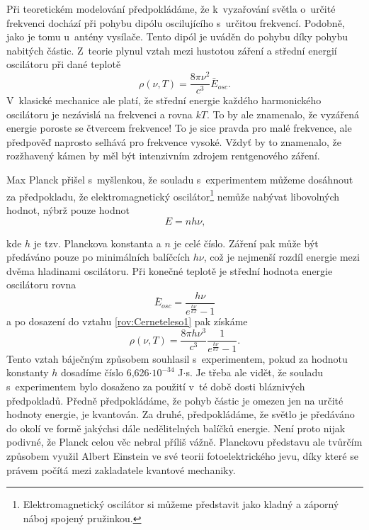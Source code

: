 Při teoretickém modelování předpokládáme, že k~vyzařování světla o~určité frekvenci dochází při pohybu dipólu oscilujícího s~určitou frekvencí. Podobně, jako je tomu u~antény vysílače. Tento dipól je uváděn do pohybu díky pohybu nabitých částic. Z~teorie plynul vztah mezi hustotou záření a střední energií oscilátoru při dané teplotě
\begin{equation}
\rho(\nu,T)=\frac{8\pi\nu^2}{c^3}\bar{E}_{osc}\mbox{.}
\label{rov:Cerneteleso1}
\end{equation}
V~klasické mechanice ale platí, že střední energie každého harmonického oscilátoru je nezávislá na frekvenci a rovna $kT$. To by ale znamenalo, že vyzářená energie poroste se čtvercem frekvence! To je sice pravda pro malé frekvence, ale předpověď naprosto selhává pro frekvence vysoké. Vždyť by to znamenalo, že rozžhavený kámen by měl být intenzivním zdrojem rentgenového záření. 

Max Planck přišel s~myšlenkou, že souladu s~experimentem můžeme dosáhnout za předpokladu, že elektromagnetický oscilátor\footnote{ Elektromagnetický oscilátor si můžeme představit jako kladný a záporný náboj spojený pružinkou.} nemůže nabývat libovolných hodnot, nýbrž pouze hodnot
\begin{equation}
E=nh\nu\mbox{,}
\label{rov:Cerneteleso2}
\end{equation}

\noindent kde $h$ je tzv. Planckova konstanta a $n$ je celé číslo. Záření pak může být předáváno pouze po minimálních balíčcích $h\nu$, což je nejmenší rozdíl energie mezi dvěma hladinami oscilátoru. Při konečné teplotě je střední hodnota energie oscilátoru rovna
\begin{equation}
\bar{E}_{osc}=\frac{h\nu}{e^{\frac{h\nu}{kT}}-1}\mbox{}
\label{rov:Cerneteleso3}
\end{equation}
a po dosazení do vztahu \ref{rov:Cerneteleso1} pak získáme
\begin{equation}
\boxed{\rho(\nu,T) = \frac{8\pi h\nu^3}{c^3}\frac{1}{e^{\frac{h\nu}{kT}}-1}\mbox{.}}
\label{rov:Cerneteleso4}
\end{equation}
Tento vztah báječným způsobem souhlasil s~experimentem, pokud za hodnotu konstanty $h$ dosadíme číslo 6,626$\cdot10^{-34}$ J$\cdot$s. Je třeba ale vidět, že souladu s~experimentem bylo dosaženo za použití v~té době dosti bláznivých předpokladů. Předně předpokládáme, že pohyb částic je omezen jen na určité hodnoty energie, je kvantován. Za druhé, předpokládáme, že světlo je předáváno do okolí ve formě jakýchsi dále nedělitelných balíčků energie. Není proto nijak podivné, že Planck celou věc nebral příliš vážně. Planckovu představu ale tvůrčím způsobem využil Albert Einstein ve své teorii fotoelektrického jevu, díky které se právem počítá mezi zakladatele kvantové mechaniky.

